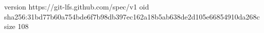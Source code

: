 version https://git-lfs.github.com/spec/v1
oid sha256:31bd77b60a754bde6f7b98db397ec162a18b5ab638de2d105e66854910da268c
size 108
